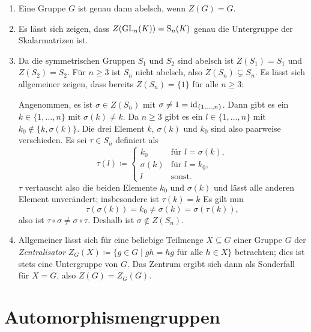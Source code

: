 \begin{bsp}
 \begin{enumerate}[leftmargin=*]
  \item
   Eine Gruppe $G$ ist genau dann abelsch, wenn $Z(G) = G$.
  \item
   Es lässt sich zeigen, dass $Z(\mathrm{GL}_n(K)) = \mathrm{S}_n(K)$ genau die Untergruppe der Skalarmatrizen ist.
  \item
   Da die symmetrischen Gruppen $S_1$ und $S_2$ sind abelsch ist $Z(S_1) = S_1$ und \mbox{$Z(S_2) = S_2$}. Für $n \geq 3$ ist $S_n$ nicht abelsch, also $Z(S_n) \subsetneq S_n$. Es lässt sich allgemeiner zeigen, dass bereits $Z(S_n) = \{1\}$ für alle $n \geq 3$:
   
   Angenommen, es ist $\sigma \in Z(S_n)$ mit $\sigma \neq 1 = \mathrm{id}_{\{1,\dotsc,n\}}$. Dann gibt es ein $k \in \{1, \dotsc, n\}$ mit $\sigma(k) \neq k$. Da $n \geq 3$ gibt es ein $l \in \{1, \dotsc, n\}$ mit $k_0 \notin \{k, \sigma(k)\}$. Die drei Element $k$, $\sigma(k)$ und $k_0$ sind also paarweise verschieden. Es sei $\tau \in S_n$ definiert als
   \[
    \tau(l) \coloneqq
    \begin{cases}
     k_0       & \text{für $l = \sigma(k)$}, \\
     \sigma(k) & \text{für $l = k_0$}, \\
     l         & \text{sonst}.
    \end{cases}
   \]
   $\tau$ vertauscht also die beiden Elemente $k_0$ und $\sigma(k)$ und lässt alle anderen Element unverändert; insbesondere ist $\tau(k) = k$ Es gilt nun
   \[
   \tau(\sigma(k)) = k_0 \neq \sigma(k) = \sigma(\tau(k)),
   \]
   also ist $\tau \circ \sigma \neq \sigma \circ \tau$. Deshalb ist $\sigma \notin Z(S_n)$.
  \item
   Allgemeiner lässt sich für eine beliebige Teilmenge $X \subseteq G$ einer Gruppe $G$ der \emph{Zentralisator} $Z_G(X) \coloneqq \{g \in G \mid \text{$gh = hg$ für alle $h \in X$}\}$ betrachten; dies ist stets eine Untergruppe von $G$. Das Zentrum ergibt sich dann als Sonderfall für $X = G$, also $Z(G) = Z_G(G)$.
 \end{enumerate}
\end{bsp}





\section{Automorphismengruppen}


